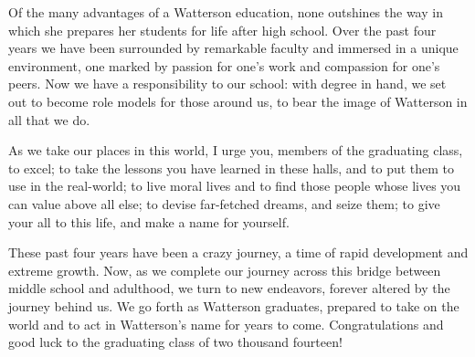 \documentclass{report}
\begin{document}
Of the many advantages of a Watterson education, none outshines the way in
which she prepares her students for life after high school. Over the past four
years we have been surrounded by remarkable faculty and immersed in a unique
environment, one marked by passion for one's work and compassion for one's
peers. Now we have a responsibility to our school: with degree in hand, we set
out to become role models for those around us, to bear the image of Watterson
in all that we do.

As we take our places in this world, I urge you, members of the graduating
class, to excel; to take the lessons you have learned in these halls, and to
put them to use in the real-world; to live moral lives and to find those people
whose lives you can value above all else; to devise far-fetched dreams, and
seize them; to give your all to this life, and make a name for yourself.

These past four years have been a crazy journey, a time of rapid development
and extreme growth. Now, as we complete our journey across this bridge between
middle school and adulthood, we turn to new endeavors, forever altered by the
journey behind us. We go forth as Watterson graduates, prepared to take on the
world and to act in Watterson's name for years to come. Congratulations and
good luck to the graduating class of two thousand fourteen!
\end{document}
